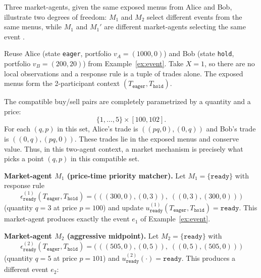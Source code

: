 \documentclass[11pt, one side, article]{memoir}
\theoremstyle{definition}
\theoremstyle{plain}
\newenvironment{example}
  {\pushQED{\qed}\renewcommand{\qedsymbol}{$\lozenge$}\examplex}
  {\popQED\endexamplex}
\newcommand{\0}{\textsf{0}}
\newcommand{\1}{\tn{\textsf{1}}}
\begin{document}
\begin{example}\label{ex:market-agent}
Three market-agents, given the same exposed menus from Alice and Bob,
illustrate two degrees of freedom: $M_1$ and $M_2$ select
different events from the same menus, while $M_1$ and $M_1'$ are
different market-agents selecting the same event%
.

Reuse Alice (state \texttt{eager}, portfolio $v_A = (1000, 0)$) and Bob (state \texttt{hold}, portfolio $v_B = (200, 20)$) from Example~\ref{ex:event}.  Take $X = 1$, so there are no local observations and a response rule is a tuple of trades alone.  The exposed menus form the 2-participant context $(T_{\texttt{eager}}, T_{\texttt{hold}})$.

The compatible buy/sell pairs are completely parametrized by a quantity and a price:
\[
\{1,\ldots,5\}\times [100,102].
\]
For each $(q,p)$ in this set, Alice's trade is $((pq,0),(0,q))$ and Bob's trade is $((0,q),(pq,0))$.  These trades lie in the exposed menus and conserve value.  Thus, in this two-agent context, a market mechanism is precisely what picks a point $(q,p)$ in this compatible set.

\medskip
\noindent\textbf{Market-agent $M_1$ (price-time priority matcher).}  Let $M_1 = \{\texttt{ready}\}$ with response rule
\[
\epsilon^{(1)}_{\texttt{ready}}(T_{\texttt{eager}}, T_{\texttt{hold}})
=\big(\,((300,0),(0,3)),\;((0,3),(300,0))\,\big)
\]
(quantity $q=3$ at price $p=100$) and update $u^{(1)}_{\texttt{ready}}(T_{\texttt{eager}}, T_{\texttt{hold}}) = \texttt{ready}$.  This market-agent produces exactly the event $e_1$ of Example~\ref{ex:event}.

\medskip
\noindent\textbf{Market-agent $M_2$ (aggressive midpoint).}  Let $M_2 = \{\texttt{ready}\}$ with
\[
\epsilon^{(2)}_{\texttt{ready}}(T_{\texttt{eager}}, T_{\texttt{hold}})
=\big(\,((505,0),(0,5)),\;((0,5),(505,0))\,\big)
\]
(quantity $q=5$ at price $p=101$) and $u^{(2)}_{\texttt{ready}}(\cdot) = \texttt{ready}$.  This produces a different event $e_2$:

\begin{center}
\end{center}


\end{example}
\end{document}
